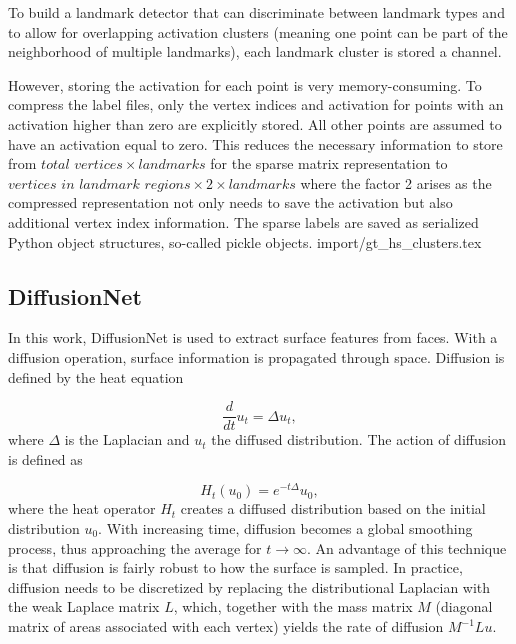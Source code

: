 \documentclass[class=article, crop=false]{standalone}
\begin{document}
To build a landmark detector that can discriminate between landmark types and to allow for overlapping activation clusters (meaning one point can be part of the neighborhood of multiple landmarks), each landmark cluster is stored a channel.

However, storing the activation for each point is very memory-consuming. To compress the label files, only the vertex indices and activation for points with an activation higher than zero are explicitly stored. All other points are assumed to have an activation equal to zero. This reduces the necessary information to store from $\textit{total vertices} \times \textit{}{landmarks}$ for the sparse matrix representation to $\textit{vertices in landmark regions} \times \textit{2} \times \textit{landmarks}$ where the factor 2 arises as the compressed representation not only needs to save the activation but also additional vertex index information. The sparse labels are saved as serialized Python object structures, so-called pickle objects.
{import/gt_hs_clusters.tex}


\subsection{DiffusionNet}
In this work, DiffusionNet \cite{sharp2022diffusionnet} is used to extract surface features from faces. With a diffusion operation, surface information is propagated through space. Diffusion is defined by the heat equation 

\begin{equation}
    \frac{d}{dt}u_t = \Delta u_t,
\end{equation}
where $\Delta$ is the Laplacian and $u_t$ the diffused distribution. The action of diffusion is defined as 

\begin{equation}
    H_t(u_0) = e^{-t\Delta}u_0,
\end{equation}
where the heat operator $H_t$ creates a diffused distribution based on the initial distribution $u_0$. With increasing time, diffusion becomes a global smoothing process, thus approaching the average for $t \to \infty$. An advantage of this technique is that diffusion is fairly robust to how the surface is sampled. In practice, diffusion needs to be discretized by replacing the distributional Laplacian with the weak Laplace matrix $L$, which, together with the mass matrix $M$ (diagonal matrix of areas associated with each vertex) yields the rate of diffusion $M^{-1}Lu$.
\end{document}
